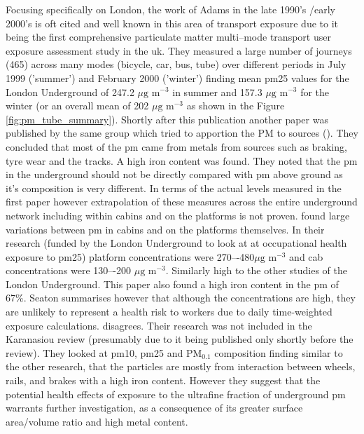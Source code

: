 Focusing specifically on London, the work of Adams in the late 1990's \slash early 2000's is oft cited and well known in this area of transport exposure due to it being the first comprehensive particulate matter multi--mode transport user exposure assessment study in the \gls{uk}. They measured a large number of journeys (465) across many modes (bicycle, car, bus, tube) over different periods in July 1999 ('summer') and February 2000 ('winter') finding mean \gls{pm25} values for the London Underground of 247.2 $\mu \text{g m}^{-3}$ in summer and 157.3 $\mu \text{g m}^{-3}$ for the winter (or an overall mean of 202 $\mu \text{g m}^{-3}$ as shown in the Figure \ref{fig:pm_tube_summary}). Shortly after this publication another paper was published by the same group which tried to apportion the PM to sources (\cite{Adams2001a}). They concluded that most of the \gls{pm} came from metals from sources such as braking, tyre wear and the tracks. A high iron content was found. They noted that the \gls{pm} in the underground should not be directly compared with \gls{pm} above ground as it's composition is very different. In terms of the actual levels measured in the first paper however extrapolation of these measures across the entire underground network including within cabins and on the platforms is not proven. \cite{Seaton2005} found large variations between \gls{pm} in cabins and on the platforms themselves. In their research (funded by the London Underground to look at at occupational health exposure to \gls{pm25}) platform concentrations were 270–-480$\mu \text{g m}^{-3}$ and cab concentrations were 130–-200 $\mu \text{g m}^{-3}$. Similarly high to the other studies of the London Underground. This paper also found a high iron content in the \gls{pm} of 67\%. Seaton summarises however that although the concentrations are high, they are unlikely to represent a health risk to workers due to daily time-weighted exposure calculations. \cite{Loxham2013} disagrees. Their research was not included in the Karanasiou review (presumably due to it being published only shortly before the review). They looked at \gls{pm10}, \gls{pm25} and PM$_{0.1}$ composition finding similar to the other research, that the particles are mostly from interaction between wheels, rails, and brakes with a high iron content. However they suggest that the potential health effects of exposure to the ultrafine fraction of underground \gls{pm} warrants further investigation, as a consequence of its greater surface area/volume ratio and high metal content.


